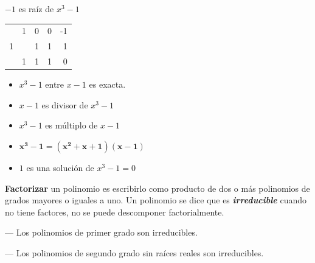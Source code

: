 \begin{miejemplo}

\begin{multicols}{2}
$-1$ es raíz de $x^3-1$
\begin{table}[H]
\centering
\begin{tabular}{r|rrrr}
 & 1 & 0 & 0 & -1 \\
1 &  & 1 & 1 & 1 \\ \hline
 & 1 & 1 & \multicolumn{1}{r|}{1} & 0 \\ \cline{5-5} 
\end{tabular}
\end{table}	

\begin{itemize}
\vspace{-2mm} \item $x^3-1$ entre $x-1$ es exacta.
\vspace{-2mm} \item $x-1$ es divisor de $x^3-1$
\vspace{-2mm} \item $x^3-1$ es múltiplo de $x-1$
\vspace{-2mm} \item $\boldsymbol{x^3-1=(x^2+x+1)(x-1)}$
\vspace{-2mm} \item $1$ es una solución de $x^3-1=0$	
\end{itemize}
\end{multicols}	
\end{miejemplo}

\vspace{5mm}
\begin{definition}[ Factorización]

\textbf{Factorizar} un polinomio es escribirlo como producto de dos o más polinomios de grados mayores o iguales a uno. Un polinomio se dice que es \textbf{\emph{irreducible}} cuando no tiene factores, no se puede descomponer factorialmente.

\vspace{2mm} --- Los polinomios de primer grado son irreducibles.

--- Los polinomios de segundo grado sin raíces reales son irreducibles.
	
\end{definition}

